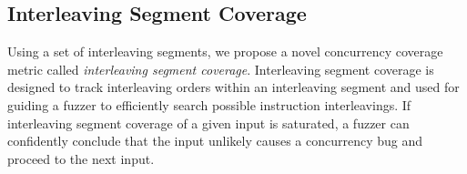 % 



\subsection{Interleaving Segment Coverage}
\label{ss:coverage}

\newcommand{\intcov}{interleaving segment coverage\xspace}
\newcommand{\Intcov}{Interleaving segment coverage\xspace}


Using a set of interleaving segments, we propose a novel concurrency coverage metric called \textit{\intcov}.
\Intcov is designed to track interleaving orders
within an interleaving segment and used for guiding a fuzzer to  
efficiently search possible instruction interleavings.
If \intcov of a given input is saturated, 
a fuzzer can confidently conclude that the input unlikely causes a concurrency bug and proceed to the next input.


